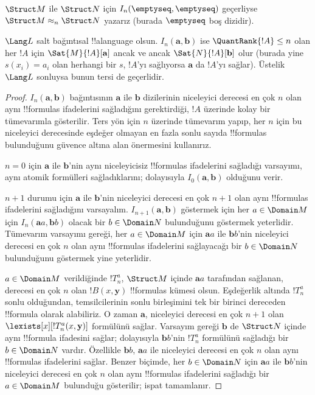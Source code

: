\documentclass[../../../include/open-logic-section]{subfiles}
\begin{document}
\begin{defn}
  $\Struct M$ ile $\Struct N$ için
  $I_n(\emptyseq,\emptyseq)$ geçerliyse
  $\Struct M\approx_n\Struct N$ yazarız (burada $\emptyseq$ boş
  dizidir).
\end{defn}

\begin{thm}
  $\Lang L$ salt bağıntısal !!a{language} olsun.
  $I_n(\mathbf a,\mathbf b)$ ise $\QuantRank{!A}\leq n$ olan her
  $!A$ için $\Sat{M}{!A}[\mathbf a]$ ancak ve ancak
  $\Sat{N}{!A}[\mathbf b]$ olur (burada yine $s(x_i)=a_i$ olan herhangi
  bir $s$, $!A$'yı sağlıyorsa $\mathbf a$ da $!A$'yı sağlar). Üstelik
  $\Lang L$ sonluysa bunun tersi de geçerlidir.
\end{thm}

\begin{proof}
  $I_n(\mathbf a,\mathbf b)$ bağıntısının $\mathbf a$ ile $\mathbf b$
  dizilerinin niceleyici derecesi en çok $n$ olan aynı !!{formula}s
  ifadelerini sağladığını gerektirdiği, $!A$ üzerinde kolay bir
  tümevarımla gösterilir. Ters yön için $n$ üzerinde tümevarım yapıp,
  her $n$ için bu niceleyici derecesinde eşdeğer olmayan en fazla sonlu
  sayıda !!{formula}s bulunduğunu güvence altına alan
   önermesini kullanırız.

  $n=0$ için $\mathbf a$ ile $\mathbf b$'nin aynı niceleyicisiz
  !!{formula}s ifadelerini sağladığı varsayımı, aynı atomik formülleri
  sağladıklarını; dolayısıyla $I_0(\mathbf a,\mathbf b)$ olduğunu verir.

  $n+1$ durumu için $\mathbf a$ ile $\mathbf b$'nin niceleyici derecesi
  en çok $n+1$ olan aynı !!{formula}s ifadelerini sağladığını
  varsayalım. $I_{n+1}(\mathbf a,\mathbf b)$ göstermek için her
  $a\in\Domain M$ için $I_n(\mathbf aa,\mathbf bb)$ olacak bir
  $b\in\Domain N$ bulunduğunu göstermek yeterlidir. Tümevarım
  varsayımı gereği, her $a\in\Domain M$ için $\mathbf aa$ ile
  $\mathbf bb$'nin niceleyici derecesi en çok $n$ olan aynı
  !!{formula}s ifadelerini sağlayacağı bir $b\in\Domain N$ bulunduğunu
  göstermek yine yeterlidir.

  $a\in\Domain M$ verildiğinde $!T^a_n$, $\Struct M$ içinde
  $\mathbf aa$ tarafından sağlanan, derecesi en çok $n$ olan
  $!B(x,\mathbf y)$ !!{formula}s kümesi olsun. Eşdeğerlik altında
  $!T^a_n$ sonlu olduğundan, temsilcilerinin sonlu birleşimini tek bir
  birinci dereceden !!{formula} olarak alabiliriz. O zaman $\mathbf a$,
  niceleyici derecesi en çok $n+1$ olan
  $\lexists[x][!T^a_n(x,\mathbf y)]$ formülünü sağlar. Varsayım gereği
  $\mathbf b$ de $\Struct N$ içinde aynı !!{formula} ifadesini sağlar;
  dolayısıyla $\mathbf bb$'nin $!T^a_n$ formülünü sağladığı bir
  $b\in\Domain N$ vardır. Özellikle $\mathbf bb$, $\mathbf aa$ ile
  niceleyici derecesi en çok $n$ olan aynı !!{formula}s ifadelerini
  sağlar. Benzer biçimde, her $b\in\Domain N$ için $\mathbf aa$ ile
  $\mathbf bb$'nin niceleyici derecesi en çok $n$ olan aynı
  !!{formula}s ifadelerini sağladığı bir $a\in\Domain M$ bulunduğu
  gösterilir; ispat tamamlanır.
\end{proof}
\end{document}
